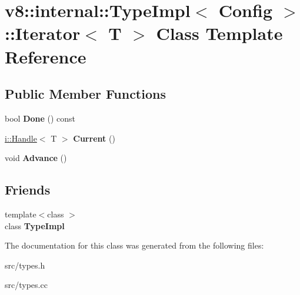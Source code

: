 \hypertarget{classv8_1_1internal_1_1_type_impl_1_1_iterator}{}\section{v8\+:\+:internal\+:\+:Type\+Impl$<$ Config $>$\+:\+:Iterator$<$ T $>$ Class Template Reference}
\label{classv8_1_1internal_1_1_type_impl_1_1_iterator}
\subsection*{Public Member Functions}
\begin{DoxyCompactItemize}
\item 
\hypertarget{classv8_1_1internal_1_1_type_impl_1_1_iterator_ad543097c8869431b7baa69421bd25c93}{}bool {\bfseries Done} () const \label{classv8_1_1internal_1_1_type_impl_1_1_iterator_ad543097c8869431b7baa69421bd25c93}

\item 
\hypertarget{classv8_1_1internal_1_1_type_impl_1_1_iterator_a72e022fb467c034ea49216114d1c518b}{}\hyperlink{classv8_1_1internal_1_1_handle}{i\+::\+Handle}$<$ T $>$ {\bfseries Current} ()\label{classv8_1_1internal_1_1_type_impl_1_1_iterator_a72e022fb467c034ea49216114d1c518b}

\item 
\hypertarget{classv8_1_1internal_1_1_type_impl_1_1_iterator_aae2e5125d72d5490113a6bdfec017480}{}void {\bfseries Advance} ()\label{classv8_1_1internal_1_1_type_impl_1_1_iterator_aae2e5125d72d5490113a6bdfec017480}

\end{DoxyCompactItemize}
\subsection*{Friends}
\begin{DoxyCompactItemize}
\item 
\hypertarget{classv8_1_1internal_1_1_type_impl_1_1_iterator_a4329ebeb28d34f95516ba1e6939c015b}{}{\footnotesize template$<$class $>$ }\\class {\bfseries Type\+Impl}\label{classv8_1_1internal_1_1_type_impl_1_1_iterator_a4329ebeb28d34f95516ba1e6939c015b}

\end{DoxyCompactItemize}


The documentation for this class was generated from the following files\+:\begin{DoxyCompactItemize}
\item 
src/types.\+h\item 
src/types.\+cc\end{DoxyCompactItemize}
